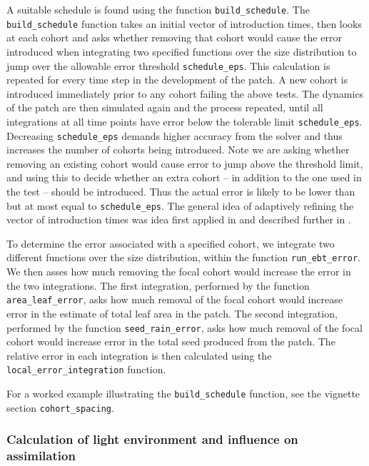 \documentclass[10pt,twoside]{article}
\begin{document}
A suitable schedule is found using the function \texttt{build\_schedule}.
The \texttt{build\_schedule} function takes an
initial vector of introduction times, then looks at each cohort and asks
whether removing that cohort would cause the error introduced when
integrating two specified functions over the size distribution to jump
over the allowable error threshold \texttt{schedule\_eps}. This
calculation is repeated for every time step in the development of the
patch. A new cohort is introduced immediately prior to any cohort
failing the above tests. The dynamics of the patch are
then simulated again and the process repeated, until all integrations at
all time points have error below the tolerable limit
\texttt{schedule\_eps}. Decreasing \texttt{schedule\_eps} demands higher
accuracy from the solver and thus increases the number of cohorts being
introduced. Note we are asking whether removing an existing cohort would
cause error to jump above the threshold limit, and using this to decide
whether an extra cohort -- in addition to the one used in the test --
should be introduced. Thus the actual error is likely to
be lower than but at most equal to \texttt{schedule\_eps}. The general idea
of adaptively refining the vector of introduction times was idea first applied
in \citet{Falster-2011} and described further in \citet{Falster-2015}.

To determine the error associated with a specified cohort, we integrate
two different functions over the size distribution, within the function
\texttt{run\_ebt\_error}. We then asses how much removing the focal
cohort would increase the error in the two integrations. The first
integration, performed by the function \texttt{area\_leaf\_error}, asks
how much removal of the focal cohort would increase error in the
estimate of total leaf area in the patch. The second integration,
performed by the function \texttt{seed\_rain\_error}, asks how much
removal of the focal cohort would increase error in the total seed
produced from the patch. The relative error in each integration is then
calculated using the \texttt{local\_error\_integration} function.

For a worked example illustrating the \texttt{build\_schedule} function,
see the vignette section \texttt{cohort\_spacing}.

\subsubsection{Calculation of light environment and influence on
assimilation}\label{calculation-of-light-environment-and-influence-on-assimilation}
\end{document}
